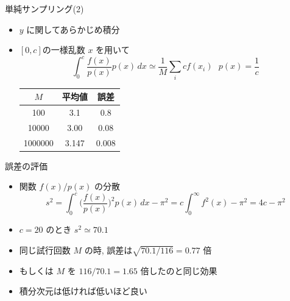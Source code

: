 \begin{frame}[t,fragile]{単純サンプリング(2)}
  \begin{itemize}
    \setlength{\itemsep}{1em}
  \item $y$ に関してあらかじめ積分
  \item $[0,c]$の一様乱数 $x$ を用いて
    \[
    \int_0^c \frac{f(x)}{p(x)} p(x) \, dx \simeq \frac{1}{M} \sum_i c f(x_i) \ \ \ p(x) = \frac{1}{c}
    \]
    \begin{tabular}{|c|c|c|}
      \hline
      $M$ & 平均値 & 誤差 \\
      \hline
      100 & 3.1 & 0.8 \\
      10000 & 3.00 & 0.08 \\
      1000000 & 3.147 & 0.008 \\
      \hline
    \end{tabular}
  \end{itemize}
  \vspace*{-7em}
  \hspace*{17em}
\end{frame}

\begin{frame}[t,fragile]{誤差の評価}
  \begin{itemize}
    \setlength{\itemsep}{1em}
  \item 関数 $f(x)/p(x)$ の分散
    \[
    s^2 = \int_0^c \Big(\frac{f(x)}{p(x)}\Big)^2 p(x) \, dx - \pi^2 = c \int_0^\infty f^2(x) - \pi^2 = 4c - \pi^2
    \]
  \item $c=20$ のとき $s^2 \simeq 70.1$
  \item 同じ試行回数 $M$ の時, 誤差は$\sqrt{70.1/116} = 0.77$ 倍
  \item もしくは $M$ を $116/70.1 = 1.65$ 倍したのと同じ効果
  \item 積分次元は低ければ低いほど良い
  \end{itemize}
\end{frame}

